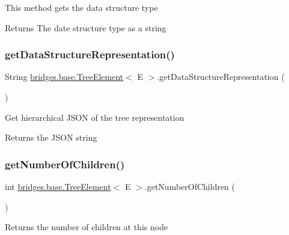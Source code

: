 This method gets the data structure type

\begin{DoxyReturn}{Returns}
The date structure type as a string 
\end{DoxyReturn}
\mbox{\label{classbridges_1_1base_1_1_tree_element_a674870c91b39fac88d35a569fd505e9b}} 
\subsubsection{\texorpdfstring{get\+Data\+Structure\+Representation()}{getDataStructureRepresentation()}}
{\footnotesize\ttfamily String \hyperlink{classbridges_1_1base_1_1_tree_element}{bridges.\+base.\+Tree\+Element}$<$ E $>$.get\+Data\+Structure\+Representation (\begin{DoxyParamCaption}{ }\end{DoxyParamCaption})}

Get hierarchical J\+S\+ON of the tree representation

\begin{DoxyReturn}{Returns}
the J\+S\+ON string 
\end{DoxyReturn}
\mbox{\label{classbridges_1_1base_1_1_tree_element_a3722c7cec66ff297f999870df0da3cff}} 
\subsubsection{\texorpdfstring{get\+Number\+Of\+Children()}{getNumberOfChildren()}}
{\footnotesize\ttfamily int \hyperlink{classbridges_1_1base_1_1_tree_element}{bridges.\+base.\+Tree\+Element}$<$ E $>$.get\+Number\+Of\+Children (\begin{DoxyParamCaption}{ }\end{DoxyParamCaption})}

Returns the number of children at this node

